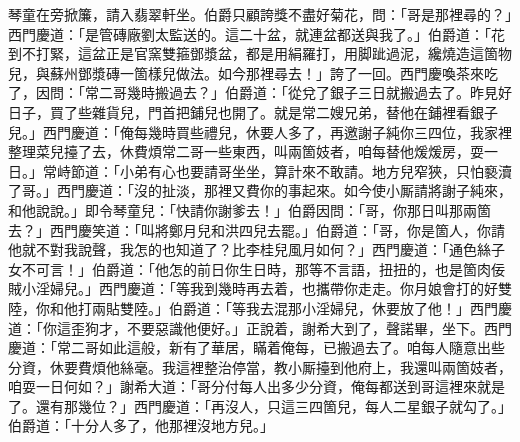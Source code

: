 琴童在旁掀簾，請入翡翠軒坐。伯爵只顧誇獎不盡好菊花，問：「哥是那裡尋的？」西門慶道：「是管磚廠劉太監送的。這二十盆，就連盆都送與我了。」伯爵道：「花到不打緊，這盆正是官窯雙箍鄧漿盆，{}都是用絹羅打，用脚跐過泥，纔燒造這箇物兒，與蘇州鄧漿磚一箇樣兒做法。如今那裡尋去！」誇了一回。西門慶喚茶來吃了，因問：「常二哥幾時搬過去？」伯爵道：「從兌了銀子三日就搬過去了。昨見好日子，買了些雜貨兒，門首把鋪兒也開了。就是常二嫂兄弟，替他在鋪裡看銀子兒。」西門慶道：「俺每幾時買些禮兒，休要人多了，再邀謝子純你三四位，我家裡整理菜兒擡了去，休費煩常二哥一些東西，叫兩箇妓者，咱每替他煖煖房，耍一日。」常峙節道：「小弟有心也要請哥坐坐，算計來不敢請。地方兒窄狹，只怕褻瀆了哥。」西門慶道：「沒的扯淡，那裡又費你的事起來。如今使小厮請將謝子純來，和他說說。」即令琴童兒：「快請你謝爹去！」伯爵因問：「哥，你那日叫那兩箇去？」西門慶笑道：「叫將鄭月兒和洪四兒去罷。」伯爵道：「哥，你是箇人，你請他就不對我說聲，我怎的也知道了？比李桂兒風月如何？」西門慶道：「通色絲子女不可言！」伯爵道：「他怎的前日你生日時，那等不言語，扭扭的，也是箇肉佞賊小淫婦兒。」西門慶道：「等我到幾時再去着，也攜帶你走走。你月娘會打的好雙陸，你和他打兩貼雙陸。」伯爵道：「等我去混那小淫婦兒，休要放了他！」西門慶道：「你這歪狗才，不要惡識他便好。」正說着，謝希大到了，聲諾畢，坐下。西門慶道：「常二哥如此這般，新有了華居，瞞着俺每，已搬過去了。咱每人隨意出些分資，休要費煩他絲毫。我這裡整治停當，教小厮擡到他府上，我還叫兩箇妓者，咱耍一日何如？」謝希大道：「哥分付每人出多少分資，俺每都送到哥這裡來就是了。還有那幾位？」西門慶道：「再沒人，只這三四箇兒，每人二星銀子就勾了。」伯爵道：「十分人多了，他那裡沒地方兒。」

